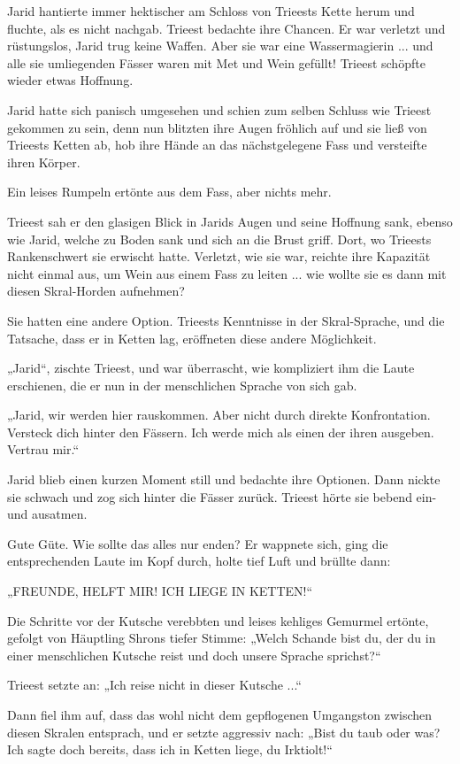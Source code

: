 Jarid hantierte immer hektischer am Schloss von Trieests Kette herum und fluchte, als es nicht nachgab. Trieest bedachte ihre Chancen. Er war verletzt und rüstungslos, Jarid trug keine Waffen. Aber sie war eine Wassermagierin ... und alle sie umliegenden Fässer waren mit Met und Wein gefüllt! Trieest schöpfte wieder etwas Hoffnung.

Jarid hatte sich panisch umgesehen und schien zum selben Schluss wie Trieest gekommen zu sein, denn nun blitzten ihre Augen fröhlich auf und sie ließ von Trieests Ketten ab, hob ihre Hände an das nächstgelegene Fass und versteifte ihren Körper.

Ein leises Rumpeln ertönte aus dem Fass, aber nichts mehr.

Trieest sah er den glasigen Blick in Jarids Augen und seine Hoffnung sank, ebenso wie Jarid, welche zu Boden sank und sich an die Brust griff. Dort, wo Trieests Rankenschwert sie erwischt hatte. Verletzt, wie sie war, reichte ihre Kapazität nicht einmal aus, um Wein aus einem Fass zu leiten ... wie wollte sie es dann mit diesen Skral-Horden aufnehmen?

Sie hatten eine andere Option. Trieests Kenntnisse in der Skral-Sprache, und die Tatsache, dass er in Ketten lag, eröffneten diese andere Möglichkeit.

„Jarid“, zischte Trieest, und war überrascht, wie kompliziert ihm die Laute erschienen, die er nun in der menschlichen Sprache von sich gab.

„Jarid, wir werden hier rauskommen. Aber nicht durch direkte Konfrontation. Versteck dich hinter den Fässern. Ich werde mich als einen der ihren ausgeben. Vertrau mir.“

Jarid blieb einen kurzen Moment still und bedachte ihre Optionen. Dann nickte sie schwach und zog sich hinter die Fässer zurück. Trieest hörte sie bebend ein- und ausatmen.

Gute Güte. Wie sollte das alles nur enden? Er wappnete sich, ging die entsprechenden Laute im Kopf durch, holte tief Luft und brüllte dann:

„FREUNDE, HELFT MIR! ICH LIEGE IN KETTEN!“

Die Schritte vor der Kutsche verebbten und leises kehliges Gemurmel ertönte, gefolgt von Häuptling Shrons tiefer Stimme: „Welch Schande bist du, der du in einer menschlichen Kutsche reist und doch unsere Sprache sprichst?“

Trieest setzte an: „Ich reise nicht in dieser Kutsche ...“

Dann fiel ihm auf, dass das wohl nicht dem gepflogenen Umgangston zwischen diesen Skralen entsprach, und er setzte aggressiv nach: „Bist du taub oder was? Ich sagte doch bereits, dass ich in Ketten liege, du Irktiolt!“

